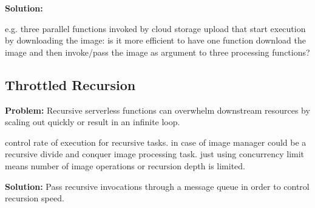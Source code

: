 
\textbf{Solution:}

e.g. three parallel functions invoked by cloud storage upload that start execution by downloading the image: is it more efficient to have one function download the image and then invoke/pass the image as argument to three processing functions?

\subsection{Throttled Recursion} \label{subsec:throttledRecursion}

\textbf{Problem:} Recursive serverless functions can overwhelm downstream resources by scaling out quickly or result in an infinite loop.

control rate of execution for recursive tasks.
in case of image manager could be a recursive divide and conquer image processing task.
just using concurrency limit means number of image operations or recursion depth is limited.

\textbf{Solution:} Pass recursive invocations through a message queue in order to control recursion speed.
